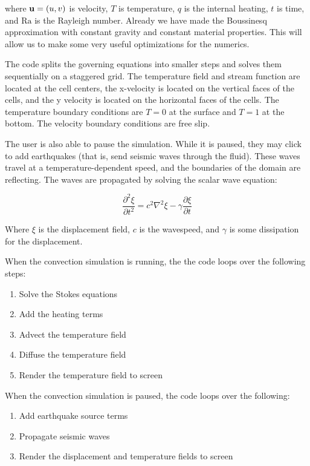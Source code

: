 \documentclass[a4paper,10pt]{article}
\begin{document}
where ${\bf u} = (u,v)$ is velocity, $T$ is temperature, $q$ is the internal heating, $t$ is time, and $\mathrm{Ra}$ is the Rayleigh number.
Already we have made the Boussinesq approximation with constant gravity and constant material properties.
This will allow us to make some very useful optimizations for the numerics.

The code splits the governing equations into smaller steps and solves them sequentially on a staggered grid.
The temperature field and stream function are located at the cell centers, the x-velocity is located on the vertical faces of the cells, and the y velocity is located on the horizontal faces of the cells.
The temperature boundary conditions are $T=0$ at the surface and $T=1$ at the bottom.
The velocity boundary conditions are free slip.

The user is also able to pause the simulation.  While it is paused, they may click to add earthquakes (that is, send seismic waves through the fluid).  These waves travel at a temperature-dependent speed, and the boundaries of the domain are reflecting.  The waves are propagated by solving the scalar wave equation:

\begin{equation}
\frac{\partial^2 \xi}{\partial t^2} = c^2 \nabla^2 \xi - \gamma \frac{\partial \xi}{\partial t}
\end{equation}

Where $\xi$ is the displacement field, $c$ is the wavespeed, and $\gamma$ is some dissipation for the displacement.

When the convection simulation is running, the the code loops over the following steps:

\begin{enumerate}
\item{Solve the Stokes equations}
\item{Add the heating terms}
\item{Advect the temperature field}
\item{Diffuse the temperature field}
\item{Render the temperature field to screen}
\end{enumerate}

When the convection simulation is paused, the code loops over the following:
\begin{enumerate}
\item{Add earthquake source terms}
\item{Propagate seismic waves}
\item{Render the displacement and temperature fields to screen}
\end{enumerate}
\end{document}
